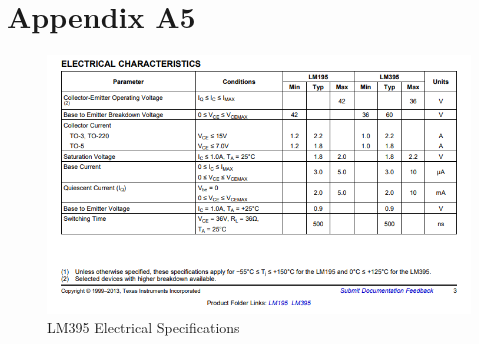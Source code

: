 \documentclass[class=report,11pt,crop=false]{standalone}
\begin{document}
	\chapter{Appendix A5}
	\begin{figure}[h!]
		\centering
		\includegraphics[width=0.4\linewidth]{Figures/LM395 SPECS.png}
		\caption{LM395 Electrical Specifications}
		\label{fig:P5}
	\end{figure}
	\ifstandalone
	
	\printnoidxglossary[type=\acronymtype,nonumberlist]
	\fi
\end{document}

